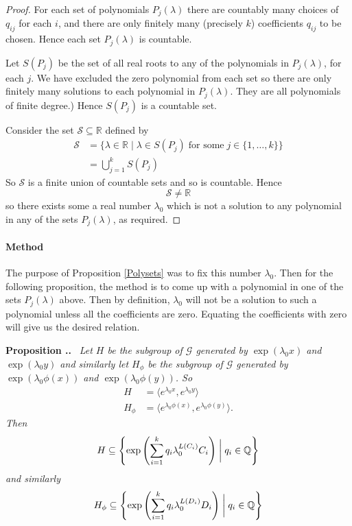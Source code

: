 \documentclass[honours]{UNSWthesis}
\newcommand{\R}{\mathbb{R}}
\newcommand{\Q}{\mathbb{Q}}
\newcommand{\G}{\mathcal{G}}
\newcommand{\1}{\mathbf{e}_{1}}
\newcommand{\2}{\mathbf{e}_{3}}
\newcommand{\3}{\mathbf{e}_{3}}
\newcounter{Item}[section]
\newenvironment{Proposition}{\medskip
                            \refstepcounter{Item}
                            \noindent
                           {\bf Proposition \thesection.\theItem.}\ %
                            \begingroup \sl}
                           {\endgroup\medskip}
\begin{document}
\begin{proof}
For each set of polynomials $P_j(\lambda)$ there are countably many choices of $q_{ij}$ for each $i$, and there are only finitely many (precisely $k$) coefficients $q_{ij}$ to be chosen. Hence each set $P_j(\lambda)$ is countable. 

Let $S(P_j)$ be the set of all real roots to any of the polynomials in $P_j (\lambda)$, for each $j$. We have excluded the zero polynomial from each set so there are only finitely many solutions to each polynomial in $P_j (\lambda)$. They are all polynomials of finite degree.) Hence $S(P_j)$ is a countable set. 

Consider the set $\mathcal{S} \subseteq \R$ defined by
\begin{align*}
\mathcal{S} &= \{ \lambda \in \R \mid \lambda \in S(P_j) \; \text{for some} \; j \in \{1,\ldots,k\}\} \\
&= \bigcup_{j=1}^{k} S(P_j) 
\end{align*}
So $\mathcal{S}$ is a finite union of countable sets and so is countable. Hence
\[
\mathcal{S} \neq \R
\]
so there exists some a real number $\lambda_0$ which is not a solution to any polynomial in any of the sets $P_j(\lambda)$, as required.
\end{proof}

\paragraph*{Method}
The purpose of Proposition \ref{Polysets} was to fix this number $\lambda_0$. Then for the following proposition, the method is to come up with a polynomial in one of the sets $P_j(\lambda)$ above. Then by definition, $\lambda_0$ will not be a solution to such a polynomial unless all the coefficients are zero. Equating the coefficients with zero will give us the desired relation.

\begin{Proposition}
Let $H$ be the subgroup of $\G$ generated by $\exp(\lambda_0 x)$ and $\exp(\lambda_0 y)$ and similarly let $H_{\phi}$ be the subgroup of $\G$ generated by $\exp(\lambda_0 \phi(x))$ and $\exp(\lambda_0 \phi(y))$. So 
\begin{align*}
H &=\langle e^{\lambda_0 x}, e^{\lambda_0 y} \rangle \\
H_{\phi} &= \langle e^{\lambda_0\phi(x)}, e^{\lambda_0 \phi(y)} \rangle.
\end{align*}
Then 
\[
H \subseteq \left\lbrace \exp \left( \sum\limits_{i=1}^{k} q_{i}\lambda_{0}^{L(C_{i})}C_{i} \right) \biggm| q_{i} \in \Q \right\rbrace
\]
and similarly
\[
H_{\phi} \subseteq \left\lbrace \exp \left( \sum\limits_{i=1}^{k} q_{i}\lambda_{0}^{L(D_{i})}D_{i} \right) \biggm| q_{i} \in \Q \right\rbrace
\]
\end{Proposition}
\end{document}
